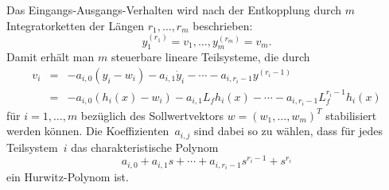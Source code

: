 Das Eingangs-Ausgangs-Verhalten wird nach der Entkopplung durch $m$
Integratorketten der Längen $r_{1},\ldots,r_{m}$ beschrieben: 
\[
y_{1}^{(r_{1})}=v_{1},\ldots,y_{m}^{(r_{m})}=v_{m}.
\]
Damit erhält man $m$ steuerbare lineare Teilsysteme, die durch 
\begin{equation}
\begin{array}{ccl}
v_{i} & = & -a_{i,0}(y_{i}-w_{i})-a_{i,1}\dot{y}_{i}-\cdots-a_{i,r_{i}-1}y^{(r_{i}-1)}\\
 & = & -a_{i,0}(h_{i}(x)-w_{i})-a_{i,1}L_{f}h_{i}(x)-\cdots-a_{i,r_{i}-1}L_{f}^{r_{i}-1}h_{i}(x)
\end{array}\label{eq:stabilisierung-mimo-teilsysteme}
\end{equation}
für $i=1,\ldots,m$ bezüglich des Sollwertvektors $w=(w_{1},\ldots,w_{m})^{T}$
stabilisiert werden können. Die Koeffizienten~$a_{i,j}$ sind dabei
so zu wählen, dass für jedes Teilsystem~$i$ das charakteristische
Polynom
\[
a_{i,0}+a_{i,1}s+\cdots+a_{i,r_{i}-1}s^{r_{i}-1}+s^{r_{i}}
\]
ein Hurwitz-Polynom ist.

